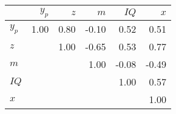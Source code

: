 \begin{tabular}{lrrrrr}
\hline
 & $y_{p}$  & $z$  & $m$  & $IQ$  & $x$  \\ 
\hline
$y_{p}$ & 1.00  & 0.80  & -0.10  & 0.52  & 0.51  \\ 
$z$ &   & 1.00  & -0.65  & 0.53  & 0.77  \\ 
$m$ &   &   & 1.00  & -0.08  & -0.49  \\ 
$IQ$ &   &   &   & 1.00  & 0.57  \\ 
$x$ &   &   &   &   & 1.00  \\ 
\hline
\end{tabular}%

